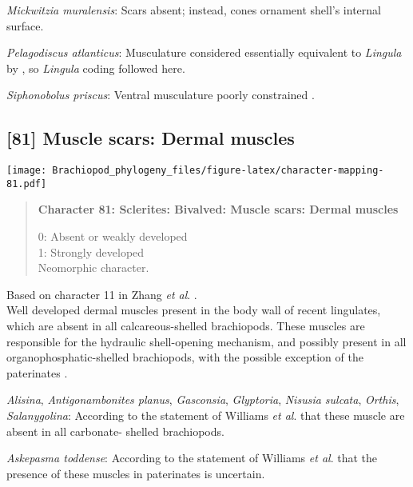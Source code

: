 \documentclass[openany]{book}
\theoremstyle{definition}
\theoremstyle{definition}
\theoremstyle{definition}
\theoremstyle{remark}
\begin{document}
\hypertarget{Mickwitzia_muralensis-coding-80}{}
\emph{Mickwitzia muralensis}: Scars absent; instead, cones ornament
shell's internal surface.

\hypertarget{Pelagodiscus_atlanticus-coding-80}{}
\emph{Pelagodiscus atlanticus}: Musculature considered essentially
equivalent to \emph{Lingula} by
\citet{Williams2000LinguliformeaCraniiformea}, so \emph{Lingula} coding
followed here.

\hypertarget{Siphonobolus_priscus-coding-80}{}
\emph{Siphonobolus priscus}: Ventral musculature poorly constrained
\citep{Williams2000LinguliformeaCraniiformea, Popov2009Earlyontogeny}.

\subsection*{{[}81{]} Muscle scars: Dermal
muscles}\label{muscle-scars-dermal-muscles}

\texttt{[image: Brachiopod\_phylogeny\_files/figure-latex/character-mapping-81.pdf]}

\begin{quote}
\textbf{Character 81: Sclerites: Bivalved: Muscle scars: Dermal muscles}

0: Absent or weakly developed\\
1: Strongly developed\\
Neomorphic character.
\end{quote}

Based on character 11 in Zhang \emph{et al}.
\citeyearpar{Zhang2014Anearly}.\\
Well developed dermal muscles present in the body wall of recent
lingulates, which are absent in all calcareous-shelled brachiopods.
These muscles are responsible for the hydraulic shell-opening mechanism,
and possibly present in all organophosphatic-shelled brachiopods, with
the possible exception of the paterinates
\citep[p.~32]{Williams2000LinguliformeaCraniiformea}.

\hypertarget{Alisina-coding-81}{}
\emph{Alisina}, \emph{Antigonambonites planus}, \emph{Gasconsia},
\emph{Glyptoria}, \emph{Nisusia sulcata}, \emph{Orthis},
\emph{Salanygolina}: According to the statement of Williams \emph{et
al}. \citeyearpar[p.~32]{Williams2000LinguliformeaCraniiformea} that
these muscle are absent in all carbonate- shelled brachiopods.

\hypertarget{Askepasma_toddense-coding-81}{}
\emph{Askepasma toddense}: According to the statement of Williams
\emph{et al}. \citeyearpar[p.~32]{Williams2000LinguliformeaCraniiformea}
that the presence of these muscles in paterinates is uncertain.
\end{document}
